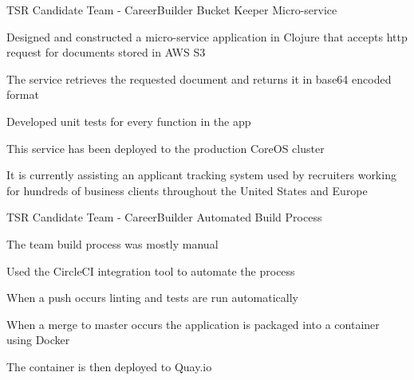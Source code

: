 

\begin{cventries}

  \cventry
  	{TSR Candidate Team - CareerBuilder} %
    {Bucket Keeper Micro-service} %
    {} %
    {} %
    {
      \begin{cvitems} %
        \item {Designed and constructed a micro-service application in Clojure that accepts http request for documents stored in AWS S3}
        \item {The service retrieves the requested document and returns it in base64 encoded format}
      \item {Developed unit tests for every function in the app}
      \item {This service has been deployed to the production CoreOS cluster} 
      \item {It is currently assisting an applicant tracking system used by recruiters working for hundreds of business clients throughout the United States and Europe} 
      \end{cvitems}
    }

  \cventry
   	{TSR Candidate Team - CareerBuilder} %
    {Automated Build Process} %
    {} %
    {} %
    {
      \begin{cvitems} %
        \item {The team build process was mostly manual}
        \item {Used the CircleCI integration tool to automate the process}
        \item {When a push occurs linting and tests are run automatically}
        \item {When a merge to master occurs the application is packaged into a container using Docker}
        \item {The container is then deployed to Quay.io}
      \end{cvitems}
    }


\end{cventries}
